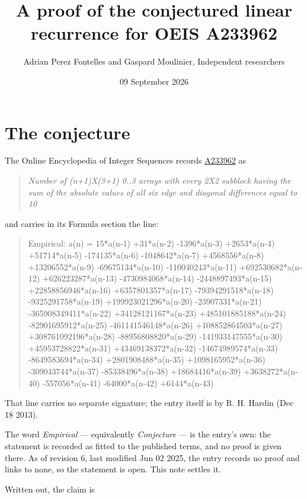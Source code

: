 \documentclass[11pt]{article}
\title{A proof of the conjectured linear recurrence for OEIS A233962}
\author{Adrian Perez Fontelles and Gaspard Moulinier, Independent researchers}
\date{09 September 2026}
\theoremstyle{definition}
\begin{document}
\maketitle
\section{The conjecture}

The Online Encyclopedia of Integer Sequences records \href{https://oeis.org/A233962}{A233962} as

\begin{quote}\itshape Number of (n+1)X(3+1) 0..3 arrays with every 2X2 subblock having the sum of the absolute values of all six edge and diagonal differences equal to 10\end{quote}

and carries in its Formula section the line:

\begin{quote}\ttfamily Empirical: a(n) = 15*a(n-1) +31*a(n-2) -1396*a(n-3) +2653*a(n-4) +51714*a(n-5) -174135*a(n-6) -1048642*a(n-7) +4568556*a(n-8) +13206552*a(n-9) -69675134*a(n-10) -110040243*a(n-11) +692530682*a(n-12) +626223287*a(n-13) -4730984068*a(n-14) -2448897493*a(n-15) +22858856946*a(n-16) +6357801357*a(n-17) -79394291518*a(n-18) -9325291758*a(n-19) +199923021296*a(n-20) -23907331*a(n-21) -365908349411*a(n-22) +34128121167*a(n-23) +485101885188*a(n-24) -82901695912*a(n-25) -461141546148*a(n-26) +108852864503*a(n-27) +308761092196*a(n-28) -88956808820*a(n-29) -141933147555*a(n-30) +45953728822*a(n-31) +43469138372*a(n-32) -14674989574*a(n-33) -8649583694*a(n-34) +2801908488*a(n-35) +1098165952*a(n-36) -309043744*a(n-37) -85338496*a(n-38) +18684416*a(n-39) +3638272*a(n-40) -557056*a(n-41) -64000*a(n-42) +6144*a(n-43)\end{quote}

That line carries no separate signature; the entry itself is by R. H. Hardin (Dec 18 2013).

The word {\itshape Empirical} --- equivalently {\itshape Conjecture} --- is the entry's own: the statement is recorded as fitted to the published terms, and no proof is given there. As of revision 6, last modified Jun 02 2025, the entry records no proof and links to none, so the statement is open. This note settles it.

Written out, the claim is
\end{document}
